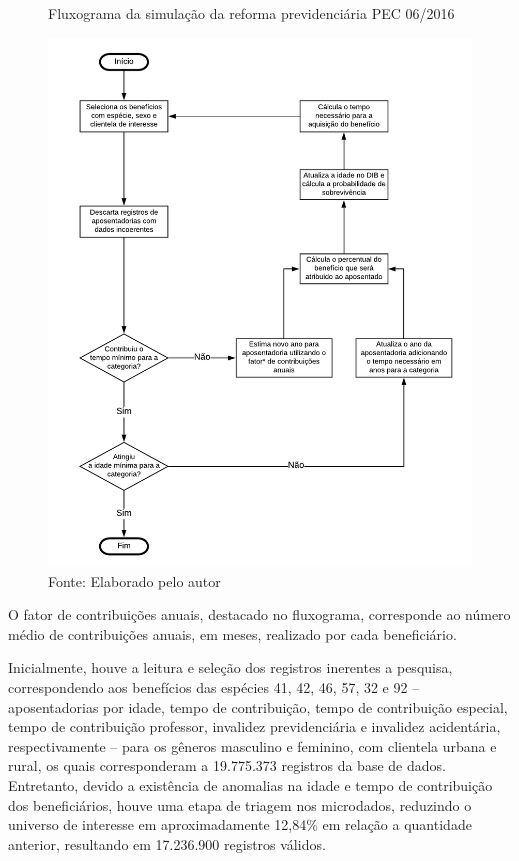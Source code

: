 \begin{figure}[!h]
    \centering
    \caption{Fluxograma da simulação da reforma previdenciária PEC 06/2016}
    \includegraphics[width=\textwidth]{figs/cap05_fluxograma_reforma_previdencia.pdf}
    \caption*{\footnotesize{Fonte: Elaborado pelo autor}}
    \label{fig:cap05:fluxograma}
\end{figure}

\noindent* O fator de contribuições anuais, destacado no fluxograma, corresponde ao número médio de contribuições anuais, em meses, realizado por cada beneficiário.

\newpage

Inicialmente, houve a leitura e seleção dos registros inerentes a pesquisa, correspondendo aos benefícios das espécies 41, 42, 46, 57, 32 e 92 – aposentadorias por idade, tempo de contribuição, tempo de contribuição especial, tempo de contribuição professor, invalidez previdenciária e invalidez acidentária, respectivamente – para os gêneros masculino e feminino, com clientela urbana e rural, os quais corresponderam a 19.775.373 registros da base de dados. Entretanto, devido a existência de anomalias na idade e tempo de contribuição dos beneficiários, houve uma etapa de triagem nos microdados, reduzindo o universo de interesse em aproximadamente 12,84\% em relação a quantidade anterior, resultando em 17.236.900 registros válidos. 


